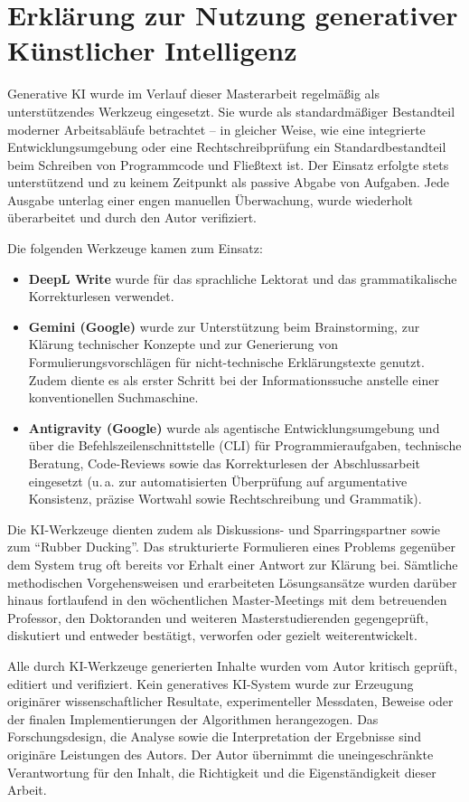 \section*{Erklärung zur Nutzung generativer Künstlicher Intelligenz}

Generative KI wurde im Verlauf dieser Masterarbeit regelmäßig als unterstützendes Werkzeug eingesetzt. Sie wurde als standardmäßiger Bestandteil moderner Arbeitsabläufe betrachtet -- in gleicher Weise, wie eine integrierte Entwicklungsumgebung oder eine Rechtschreibprüfung ein Standardbestandteil beim Schreiben von Programmcode und Fließtext ist. Der Einsatz erfolgte stets unterstützend und zu keinem Zeitpunkt als passive Abgabe von Aufgaben. Jede Ausgabe unterlag einer engen manuellen Überwachung, wurde wiederholt überarbeitet und durch den Autor verifiziert.

Die folgenden Werkzeuge kamen zum Einsatz:

\begin{itemize}
    \item \textbf{DeepL Write} wurde für das sprachliche Lektorat und das grammatikalische Korrekturlesen verwendet.
    \item \textbf{Gemini (Google)} wurde zur Unterstützung beim Brainstorming, zur Klärung technischer Konzepte und zur Generierung von Formulierungsvorschlägen für nicht-technische Erklärungstexte genutzt. Zudem diente es als erster Schritt bei der Informationssuche anstelle einer konventionellen Suchmaschine.
    \item \textbf{Antigravity (Google)} wurde als agentische Entwicklungsumgebung und über die Befehlszeilenschnittstelle (CLI) für Programmieraufgaben, technische Beratung, Code-Reviews sowie das Korrekturlesen der Abschlussarbeit eingesetzt (u.\,a. zur automatisierten Überprüfung auf argumentative Konsistenz, präzise Wortwahl sowie Rechtschreibung und Grammatik).
\end{itemize}

Die KI-Werkzeuge dienten zudem als Diskussions- und Sparringspartner sowie zum \enquote{Rubber Ducking}. Das strukturierte Formulieren eines Problems gegenüber dem System trug oft bereits vor Erhalt einer Antwort zur Klärung bei. Sämtliche methodischen Vorgehensweisen und erarbeiteten Lösungsansätze wurden darüber hinaus fortlaufend in den wöchentlichen Master-Meetings mit dem betreuenden Professor, den Doktoranden und weiteren Masterstudierenden gegengeprüft, diskutiert und entweder bestätigt, verworfen oder gezielt weiterentwickelt.

Alle durch KI-Werkzeuge generierten Inhalte wurden vom Autor kritisch geprüft, editiert und verifiziert. Kein generatives KI-System wurde zur Erzeugung originärer wissenschaftlicher Resultate, experimenteller Messdaten, Beweise oder der finalen Implementierungen der Algorithmen herangezogen. Das Forschungsdesign, die Analyse sowie die Interpretation der Ergebnisse sind originäre Leistungen des Autors. Der Autor übernimmt die uneingeschränkte Verantwortung für den Inhalt, die Richtigkeit und die Eigenständigkeit dieser Arbeit.
